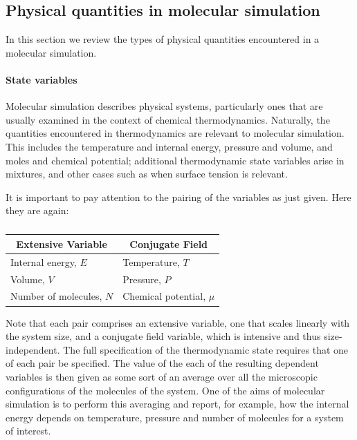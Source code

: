 \documentclass[]{article}
\date{}
\let\oldparagraph\paragraph
\renewcommand{\paragraph}[1]{\oldparagraph{#1}\mbox{}}
\begin{document}
\subsection{Physical quantities in molecular
simulation}\label{physical-quantities-in-molecular-simulation}

In this section we review the types of physical quantities encountered
in a molecular simulation.

\paragraph{State variables}\label{state-variables}

Molecular simulation describes physical systems, particularly ones that
are usually examined in the context of chemical thermodynamics.
Naturally, the quantities encountered in thermodynamics are relevant to
molecular simulation. This includes the temperature and internal energy,
pressure and volume, and moles and chemical potential; additional
thermodynamic state variables arise in mixtures, and other cases such as
when surface tension is relevant.

It is important to pay attention to the pairing of the variables as just
given. Here they are again:
\begin{table}[h]
  \centering
  \caption*{}
  \label{my-label}
  \begin{tabular}{ll}
    \hline
  \hline
  \multicolumn{1}{c}{\textbf{Extensive Variable}} & \multicolumn{1}{c}{\textbf{Conjugate Field}} \\ \hline
  Internal energy, $E$                            & Temperature, $T$                             \\
  Volume, $V$                                     & Pressure, $P$                                \\
  Number of molecules, $N$                        & Chemical potential, $\mu$                    \\ \hline
  \end{tabular}
  \end{table}

Note that each pair comprises an extensive variable, one that scales
linearly with the system size, and a conjugate field variable, which is
intensive and thus size-independent. The full specification of the
thermodynamic state requires that one of each pair be specified. The
value of the each of the resulting dependent variables is then given as
some sort of an average over all the microscopic configurations of the
molecules of the system. One of the aims of molecular simulation is to
perform this averaging and report, for example, how the internal energy
depends on temperature, pressure and number of molecules for a system of
interest.
\end{document}
